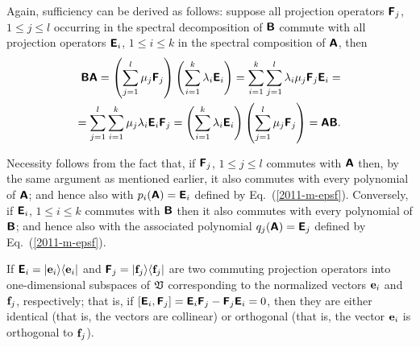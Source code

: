 {\color{OliveGreen}\bproof
Again, sufficiency can be derived as follows: suppose all projection operators $\textsf{\textbf{F}}_j$, $1\le j\le l$
occurring in the spectral decomposition of $\textsf{\textbf{B}}$
commute with all projection operators $\textsf{\textbf{E}}_i$, $1\le i\le k$
in the spectral composition of   $\textsf{\textbf{A}}$,
then
\begin{equation}
\begin{split}
 \textsf{\textbf{B}}\textsf{\textbf{A}}
=
\left(\sum_{j=1}^l \mu_j\textsf{\textbf{F}}_j\right) \left(\sum_{i=1}^k \lambda_i \textsf{\textbf{E}}_i\right)
=
\sum_{i=1}^k \sum_{j=1}^l \lambda_i \mu_j \textsf{\textbf{F}}_j\textsf{\textbf{E}}_i
=
\\
=
\sum_{j=1}^l \sum_{i=1}^k \mu_j \lambda_i \textsf{\textbf{E}}_i \textsf{\textbf{F}}_j
=
\left(\sum_{i=1}^k \lambda_i \textsf{\textbf{E}}_i \right)  \left(\sum_{j=1}^l \mu_j \textsf{\textbf{F}}_j\right)
=\textsf{\textbf{A}} \textsf{\textbf{B}}
.
\end{split}
\end{equation}


Necessity follows from the fact that, if $\textsf{\textbf{F}}_j$, $1\le j\le l$
commutes with  $\textsf{\textbf{A}}$
then, by the same argument as mentioned earlier,
it also commutes with every polynomial of  $\textsf{\textbf{A}}$;
and
hence also with $p_i(\textsf{\textbf{A}})=\textsf{\textbf{E}}_i$ defined by Eq.~(\ref{2011-m-epsf}).
Conversely,
if $\textsf{\textbf{E}}_i$, $1\le i\le k$
commutes with  $\textsf{\textbf{B}}$
then it also commutes with every polynomial of  $\textsf{\textbf{B}}$;
and
hence also with the associated polynomial
$q_j(\textsf{\textbf{A}})=\textsf{\textbf{E}}_j$ defined by Eq.~(\ref{2011-m-epsf}).
\eproof
}



If
$\textsf{\textbf{E}}_{i} = \vert {\bf e}_i \rangle \langle {\bf e}_i \vert$
and
$\textsf{\textbf{F}}_{j} = \vert {\bf f}_j \rangle \langle {\bf f}_j \vert$
are two commuting projection operators into one-dimensional subspaces of ${\frak V}$
corresponding to the normalized vectors ${\bf e}_i$  and ${\bf f}_j$,
respectively; that is, if
$\left[
\textsf{\textbf{E}}_{i}
,
\textsf{\textbf{F}}_{j}
\right]=
\textsf{\textbf{E}}_{i}
\textsf{\textbf{F}}_{j}
-
\textsf{\textbf{F}}_{j}
\textsf{\textbf{E}}_{i}
=0$,
then they are either identical (that is, the vectors are collinear)
or orthogonal (that is, the vector ${\bf e}_i$ is orthogonal to ${\bf f}_j$).


